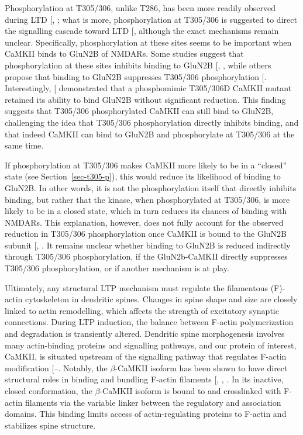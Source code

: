 \documentclass[
  11pt,
  letterpaper,
]{scrreprt}
\begin{document}
Phosphorylation at T305/306, unlike T286, has been more readily observed
during LTD {[},
\citeproc{ref-coultrap2014Autonomous}{202}{]}; what is more,
phosphorylation at T305/306 is suggested to direct the signalling
cascade toward LTD {[}\citeproc{ref-bayer2024Revised}{11}{]}, although
the exact mechanisms remain unclear. Specifically, phosphorylation at
these sites seems to be important when CaMKII binds to GluN2B of NMDARs.
Some studies suggest that phosphorylation at these sites inhibits
binding to GluN2B {[},
\citeproc{ref-cook2021CaMKII}{225}{]}, while others propose that binding
to GluN2B suppresses T305/306 phosphorylation
{[}\citeproc{ref-bayer2001Interaction}{168}{]}. Interestingly,
{[}\citeproc{ref-barcomb2014Autonomous}{226}{]} demonstrated that a
phosphomimic T305/306D CaMKII mutant retained its ability to bind GluN2B
without significant reduction. This finding suggests that T305/306
phosphorylated CaMKII can still bind to GluN2B, challenging the idea
that T305/306 phosphorylation directly inhibits binding, and that indeed
CaMKII can bind to GluN2B and phosphorylate at T305/306 at the same
time.

If phosphorylation at T305/306 makes CaMKII more likely to be in a
``closed'' state (see Section~\ref{sec-t305-p}), this would reduce its
likelihood of binding to GluN2B. In other words, it is not the
phosphorylation itself that directly inhibits binding, but rather that
the kinase, when phosphorylated at T305/306, is more likely to be in a
closed state, which in turn reduces its chances of binding with NMDARs.
This explanation, however, does not fully account for the observed
reduction in T305/306 phosphorylation once CaMKII is bound to the GluN2B
subunit {[},
\citeproc{ref-cook2021CaMKII}{225}{]}. It remains unclear whether
binding to GluN2B is reduced indirectly through T305/306
phosphorylation, if the GluN2b-CaMKII directly suppresses T305/306
phosphorylation, or if another mechanism is at play.

Ultimately, any structural LTP mechanism must regulate the filamentous
(F)-actin cytoskeleton in dendritic spines. Changes in spine shape and
size are closely linked to actin remodelling, which affects the strength
of excitatory synaptic connections. During LTP induction, the balance
between F-actin polymerization and degradation is transiently altered.
Dendritic spine morphogenesis involves many actin-binding proteins and
signalling pathways, and our protein of interest, CaMKII, is situated
upstream of the signalling pathway that regulates F-actin modification
{[}--\citeproc{ref-wang2019Assemblies}{230}{]}.
Notably, the \(\beta\)-CaMKII isoform has been shown to have direct
structural roles in binding and bundling F-actin filaments
{[},
,
\citeproc{ref-oleary2006CaMKIIv}{231}{]}. In its inactive, closed
conformation, the \(\beta\)-CaMKII isoform is bound to and crosslinked
with F-actin filaments via the variable linker between the regulatory
and association domains. This binding limits access of actin-regulating
proteins to F-actin and stabilizes spine structure.
\end{document}
